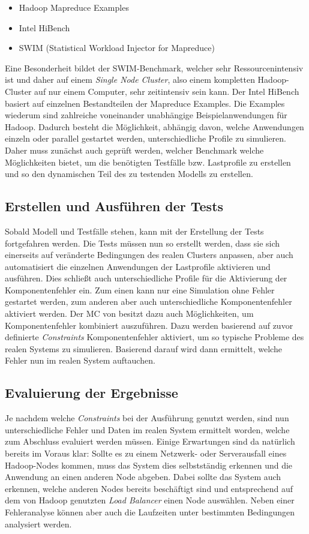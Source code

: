\begin{itemize}[noitemsep]
	\item Hadoop Mapreduce Examples
	\item Intel HiBench
	\item SWIM (Statistical Workload Injector for Mapreduce)
\end{itemize}

Eine Besonderheit bildet der SWIM-Benchmark, welcher sehr Ressourcenintensiv ist und daher auf einem \emph{Single Node Cluster}, also einem kompletten Hadoop-Cluster auf nur einem Computer, sehr zeitintensiv sein kann. Der Intel HiBench basiert auf einzelnen Bestandteilen der Mapreduce Examples. Die Examples wiederum sind zahlreiche voneinander unabhängige Beispielanwendungen für Hadoop. Dadurch besteht die Möglichkeit, abhängig davon, welche Anwendungen einzeln oder parallel gestartet werden,  unterschiedliche Profile zu simulieren. Daher muss zunächst auch geprüft werden, welcher Benchmark welche Möglichkeiten bietet, um die benötigten Testfälle bzw. Lastprofile zu erstellen und so den dynamischen Teil des zu testenden Modells zu erstellen.

\subsection{Erstellen und Ausführen der Tests}\label{sec:testausführung}

Sobald Modell und Testfälle stehen, kann mit der Erstellung der Tests fortgefahren werden. Die Tests müssen nun so erstellt werden, dass sie sich einerseits auf veränderte Bedingungen des realen Clusters anpassen, aber auch automatisiert die einzelnen Anwendungen der Lastprofile aktivieren und ausführen. Dies schließt auch unterschiedliche Profile für die Aktivierung der Komponentenfehler ein. Zum einen kann nur eine Simulation ohne Fehler gestartet werden, zum anderen aber auch unterschiedliche Komponentenfehler aktiviert werden. Der MC von \sS besitzt dazu auch Möglichkeiten, um Komponentenfehler kombiniert auszuführen. Dazu werden basierend auf zuvor definierte \emph{Constraints} Komponentenfehler aktiviert, um so typische Probleme des realen Systems zu simulieren. Basierend darauf wird dann ermittelt, welche Fehler nun im realen System auftauchen.

\subsection{Evaluierung der Ergebnisse}\label{sec:evaluierung}

Je nachdem welche \emph{Constraints} bei der Ausführung genutzt werden, sind nun unterschiedliche Fehler und Daten im realen System ermittelt worden, welche zum Abschluss evaluiert werden müssen. Einige Erwartungen sind da natürlich bereits im Voraus klar: Sollte es zu einem Netzwerk- oder Serverausfall eines Hadoop-Nodes kommen, muss das System dies selbstständig erkennen und die Anwendung an einen anderen Node abgeben. Dabei sollte das System auch erkennen, welche anderen Nodes bereits beschäftigt sind und entsprechend auf dem von Hadoop genutzten \emph{Load Balancer} einen Node auswählen. Neben einer Fehleranalyse können aber auch die Laufzeiten unter bestimmten Bedingungen analysiert werden.
